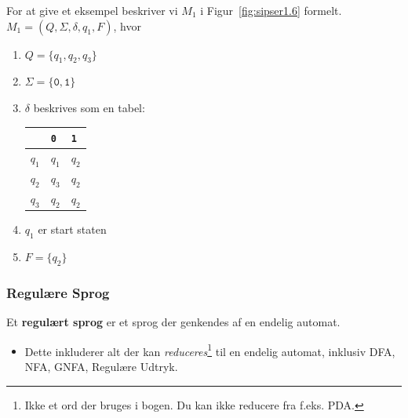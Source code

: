 \begin{frame}[allowframebreaks]
	For at give et eksempel beskriver vi $M_{1}$ i Figur~\ref{fig:sipser1.6} formelt.\\
	$M_{1} = (Q, \Sigma, \delta, q_{1}, F)$, hvor
	\begin{enumerate}
		\item $Q = \{q_{1}, q_{2}, q_{3}\}$
		\item $\Sigma = \{\mathtt{0,1}\}$
		\item $\delta$ beskrives som en tabel:
		      \begin{table}[h]
			      \centering
			      \begin{tabular}{l|ll}
				            & \texttt{0} & \texttt{1} \\ \hline
				      $q_1$ & $q_1$      & $q_2$      \\
				      $q_2$ & $q_3$      & $q_2$      \\
				      $q_3$ & $q_2$      & $q_2$
			      \end{tabular}
		      \end{table}
		\item $q_{1}$ er start staten
		\item $F = \{q_{2}\}$
	\end{enumerate}
\end{frame}

\begin{frame}
	\frametitle{Regulære Sprog}
	\begin{definition}
		Et \textbf{regulært sprog} er et sprog der genkendes af en endelig automat.
	\end{definition}
	\begin{itemize}
		\item Dette inkluderer alt der kan \textit{reduceres}\footnote{Ikke et ord der bruges i bogen. Du kan ikke reducere fra f.eks. PDA.} til en endelig automat, inklusiv DFA, NFA, GNFA, Regulære Udtryk.
	\end{itemize}
\end{frame}

